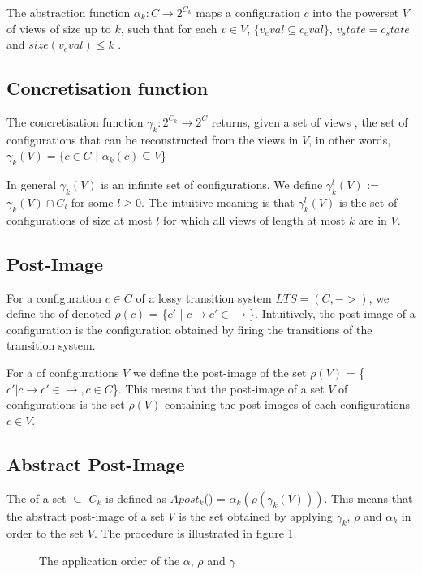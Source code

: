 The abstraction function $\alpha_k: C\rightarrow 2^{C_k}$ maps a configuration $c$ into the powerset $V$ of views of size up to $k$, such that for each $v\in V$, $\{v_eval \subseteq c_eval\}$, $v_state = c_state$ and $size(v_eval) \leq k$ .

\subsection{Concretisation function}
The concretisation function $\gamma_k: 2^{C_k} \rightarrow 2^C$ returns, given a set of views , the set of configurations that can be reconstructed from the views in $V$, in other words, $\gamma_k(V) = \{c \in C$ | $\alpha_k(c) \subseteq V$\}

In general $\gamma_k(V)$ is an infinite set of configurations. We define $\gamma_k^l(V)$ := $\gamma_k(V) \cap C_l$ for some $l\geq 0$. The intuitive meaning is that $\gamma_k^l(V)$ is the set of configurations of size at most $l$ for which all views of length at most $k$ are in $V$.

\subsection{Post-Image}
For a configuration $c\in C$ of a lossy transition system $LTS = (C,->)$, we define the  of  denoted $\rho(c)$ = \{$c'$ | $c \rightarrow c' \in \rightarrow$\}. Intuitively, the post-image of a configuration is the configuration obtained by firing the transitions of the transition system.

For a  of configurations $V$ we define the post-image of the set $\rho(V)$ = \{$c' | c \rightarrow c' \in \rightarrow, c\in C$\}. This means that the post-image of a set $V$ of configurations is the set $\rho(V)$ containing the post-images of each configurations $c\in V$.

\subsection{Abstract Post-Image}
The  of a set  $\subseteq$ $C_k$ is defined as $Apost_k$() = $\alpha_k(\rho(\gamma_k(V)))$. This means that the abstract post-image of a set $V$ is the set obtained by applying $\gamma_k$, $\rho$ and $\alpha_k$ in order to the set $V$. The procedure is illustrated in figure \ref{apost}.
\begin{figure}
\abstraction
\caption{The application order of the $\alpha$, $\rho$ and $\gamma$}
\label{apost}
\end{figure}

